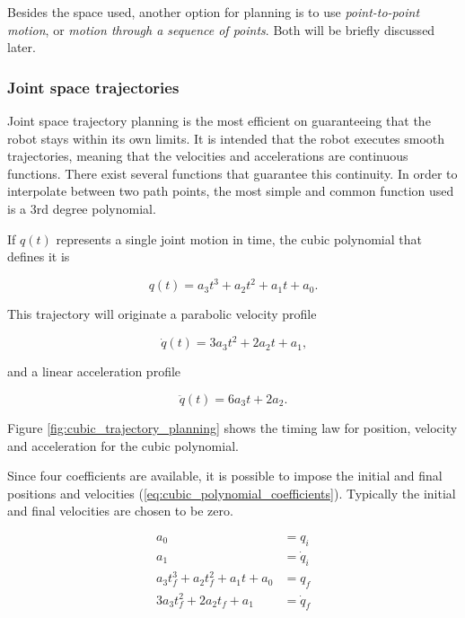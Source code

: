 Besides the space used, another option for planning is to use \emph{point-to-point motion}, or \emph{motion through a sequence of points}. Both will be briefly discussed later.

\subsubsection{Joint space trajectories}
\label{subsubsec:joint_space_trajectories}

Joint space trajectory planning is the most efficient on guaranteeing that the robot stays within its own limits. It is intended that the robot executes smooth trajectories, meaning that the velocities and accelerations are continuous functions. There exist several functions that guarantee this continuity. In order to interpolate between two path points, the most simple and common function used is a 3rd degree polynomial.

If $q(t)$ represents a single joint motion in time, the cubic polynomial that defines it is

\begin{equation}
    q(t) = a_3 t^3 + a_2 t^2 + a_1 t + a_0 \text{.}
\end{equation}

This trajectory will originate a parabolic velocity profile

\begin{equation}
    \dot{q}(t) = 3 a_3 t^2 + 2 a_2 t + a_1\text{,}
\end{equation}

and a linear acceleration profile

\begin{equation}
    \ddot{q}(t) = 6 a_3 t + 2 a_2\text{.}
\end{equation}

Figure \ref{fig:cubic_trajectory_planning} shows the timing law for position, velocity and acceleration for the cubic polynomial.

Since four coefficients are available, it is possible to impose the initial and final positions and velocities (\ref{eq:cubic_polynomial_coefficients}). Typically the initial and final velocities are chosen to be zero.

\begin{equation}
    \label{eq:cubic_polynomial_coefficients}
    \begin{aligned}
        a_0 &= q_i\\
        a_1 &= \dot{q}_i \\
        a_3 t_f^3 + a_2 t_f^2 + a_1 t + a_0 &= q_f \\
        3 a_3 t_f^2 + 2 a_2 t_f + a_1 &= \dot{q}_f 
    \end{aligned}
\end{equation}

